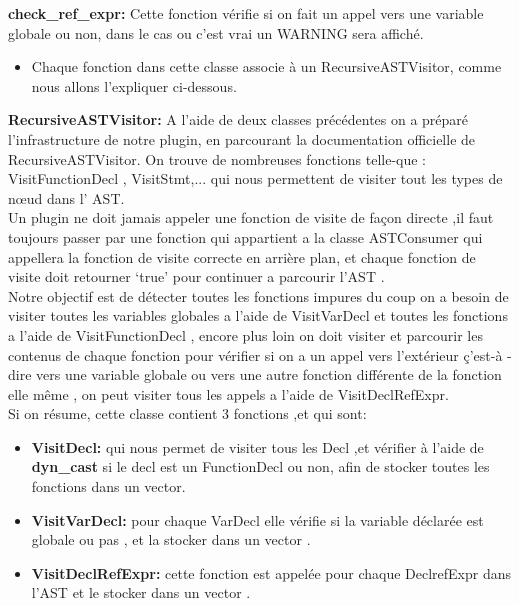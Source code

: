 \documentclass[12pt,titlepage]{article}
\begin{document}
\textbf{check\_ref\_expr:}	
 Cette fonction vérifie si on fait un appel vers une variable globale ou non, dans le cas ou c’est vrai un WARNING sera affiché. 
\begin{itemize}
\item Chaque fonction dans cette classe associe à un RecursiveASTVisitor, comme nous allons l’expliquer ci-dessous.
\end{itemize}

\textbf{RecursiveASTVisitor:}
A l’aide de deux classes précédentes on a préparé l’infrastructure de notre plugin,  en parcourant  la documentation officielle de RecursiveASTVisitor. On trouve de nombreuses fonctions  telle-que :  VisitFunctionDecl , VisitStmt,... qui nous  permettent de visiter tout les types de nœud dans l’ AST.\\
Un plugin ne doit jamais appeler une fonction de visite de façon directe ,il faut toujours passer par une fonction qui appartient a  la classe ASTConsumer qui appellera la fonction de visite correcte en arrière plan, et chaque fonction de visite doit retourner ‘true’ pour continuer a parcourir l’AST  . \\

Notre objectif est de détecter toutes les fonctions impures du coup on a besoin de visiter toutes les variables globales a l’aide  de  VisitVarDecl et toutes les fonctions a l’aide de VisitFunctionDecl , encore plus loin on doit visiter et parcourir les contenus de chaque fonction pour vérifier si on a un appel vers l’extérieur ç’est-à -dire vers une variable globale ou vers une autre fonction différente de la fonction elle même , on peut visiter tous les appels a l’aide de VisitDeclRefExpr.\\

Si on résume, cette  classe contient 3 fonctions ,et qui sont: 
\begin{itemize}
    \item  \textbf{VisitDecl:} qui nous permet de visiter tous les Decl ,et vérifier à l’aide de \textbf{ dyn\_cast} si le decl est un FunctionDecl ou non, afin de stocker toutes les fonctions dans  un vector.
\item \textbf{VisitVarDecl:} pour chaque VarDecl elle vérifie si la variable déclarée est globale ou pas , et la stocker dans un vector .
\item \textbf{VisitDeclRefExpr:} cette fonction est appelée pour chaque DeclrefExpr dans l’AST et le stocker dans un vector .
\end{itemize}
\end{document}
